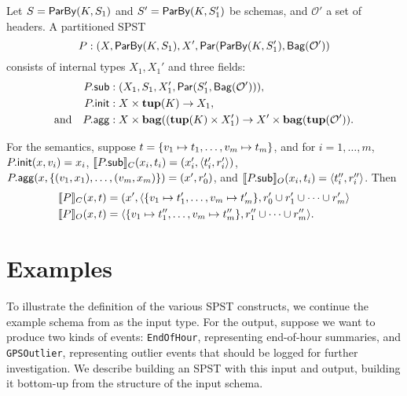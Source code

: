 \begin{definition}
Let $S = \keyby{K}{S_1}$ and $S' = \keyby{K}{S_1'}$ be schemas,
and $\mathcal{O}'$ a set of headers.
A partitioned SPST
\[
P : (X, \keyby{K}{S_1}, X', \parcomp{\keyby{K}{S_1'}}{\relleaf{\mathcal{O}'}}
\]
consists of internal types $X_1, X_1'$ and three fields:
\begin{align*}
\spstfield{P}{sub} &: (X_1, S_1, X_1', \parcomp{S_1'}{\relleaf{\mathcal{O}'}}), \\
\spstfield{P}{init} &: X \times \tup(K) \to X_1, \\
\text{and} \quad
\spstfield{P}{agg} &: X \times \bag((\tup(K) \times X_1') \to X' \times \bag(\tup(\mathcal{O}')).
\end{align*}

For the semantics,
suppose $t = \spsbag{\keyed{v_1}{t_1}, \ldots, \keyed{v_m}{t_m}}$,
and for $i = 1, \ldots, m$,
$\spstfield{P}{init}(x, v_i) = x_i$,
$\spstsemC{x_i}{t_i}{\spstfield{P}{sub}} = (x_i', \spspar{t_i'}{r_i'})$,
$\spstfield{P}{agg}(x, \{(v_1, x_1), \ldots, (v_m, x_m)\}) = (x', r_0')$,
and
$\spstsemO{x_i}{t_i}{\spstfield{P}{sub}} = \spspar{t_i''}{r_i''}$.
Then
\begin{align*}
    \spstsemC{x}{t}{P}
    &= (x', \spspar{ \spsbag{\keyed{v_1}{t_1'}, \ldots, \keyed{v_m}{t_m'}}}{r_0' \cup r_1' \cup \cdots \cup r_m'}
    \\
    \spstsemO{x}{t}{P}
    &= \spspar{\spsbag{\keyed{v_1}{t_1''}, \ldots, \keyed{v_m}{t_m''}}}{r_1'' \cup \cdots \cup r_m''}.
    \quad
\end{align*}
\end{definition}

\section{Examples}
\label{45:ssec:spst-example}

To illustrate the definition of the various SPST constructs,
we continue the example schema from  as the input type.
For the output, suppose we want to produce two kinds of events: \texttt{EndOfHour},
representing end-of-hour summaries, and \texttt{GPSOutlier}, representing
outlier events that should be logged for further investigation.
We describe building an SPST with this input and output,
building it bottom-up from the structure of the input schema.

